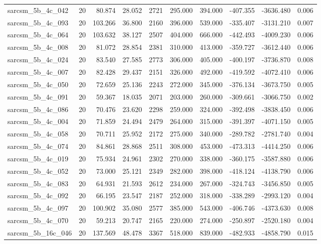 \begin{tabular}{lrrrrrrrrr}
sarcsm\_5b\_4c\_042 & 20 & 80.874 & 28.052 & 2721 & 295.000 & 394.000 & -407.355 & -3636.480 & 0.006 \\
sarcsm\_5b\_4c\_093 & 20 & 103.266 & 36.800 & 2160 & 396.000 & 539.000 & -335.407 & -3131.210 & 0.007 \\
sarcsm\_5b\_4c\_064 & 20 & 103.632 & 38.127 & 2507 & 404.000 & 666.000 & -442.493 & -4009.230 & 0.006 \\
sarcsm\_5b\_4c\_008 & 20 & 81.072 & 28.854 & 2381 & 310.000 & 413.000 & -359.727 & -3612.440 & 0.006 \\
sarcsm\_5b\_4c\_024 & 20 & 83.540 & 27.585 & 2773 & 306.000 & 405.000 & -400.197 & -3736.870 & 0.008 \\
sarcsm\_5b\_4c\_007 & 20 & 82.428 & 29.437 & 2151 & 326.000 & 492.000 & -419.592 & -4072.410 & 0.006 \\
sarcsm\_5b\_4c\_050 & 20 & 72.659 & 25.136 & 2243 & 272.000 & 345.000 & -376.134 & -3673.750 & 0.005 \\
sarcsm\_5b\_4c\_091 & 20 & 59.367 & 18.035 & 2071 & 203.000 & 260.000 & -309.661 & -3066.750 & 0.002 \\
sarcsm\_5b\_4c\_086 & 20 & 70.476 & 23.620 & 2298 & 259.000 & 324.000 & -392.498 & -3838.450 & 0.006 \\
sarcsm\_5b\_4c\_004 & 20 & 71.859 & 24.494 & 2479 & 264.000 & 315.000 & -391.397 & -4071.150 & 0.005 \\
sarcsm\_5b\_4c\_058 & 20 & 70.711 & 25.952 & 2172 & 275.000 & 340.000 & -289.782 & -2781.740 & 0.004 \\
sarcsm\_5b\_4c\_074 & 20 & 84.861 & 28.868 & 2511 & 308.000 & 453.000 & -473.313 & -4414.250 & 0.006 \\
sarcsm\_5b\_4c\_019 & 20 & 75.934 & 24.961 & 2302 & 270.000 & 338.000 & -360.175 & -3587.880 & 0.006 \\
sarcsm\_5b\_4c\_052 & 20 & 73.000 & 25.121 & 2349 & 282.000 & 398.000 & -418.124 & -4138.790 & 0.006 \\
sarcsm\_5b\_4c\_083 & 20 & 64.931 & 21.593 & 2612 & 234.000 & 267.000 & -324.743 & -3456.850 & 0.005 \\
sarcsm\_5b\_4c\_092 & 20 & 66.195 & 23.547 & 2187 & 252.000 & 318.000 & -338.289 & -2993.120 & 0.004 \\
sarcsm\_5b\_4c\_097 & 20 & 100.902 & 35.080 & 2577 & 385.000 & 543.000 & -406.746 & -4373.630 & 0.008 \\
sarcsm\_5b\_4c\_070 & 20 & 59.213 & 20.747 & 2165 & 220.000 & 274.000 & -250.897 & -2520.180 & 0.004 \\
sarcsm\_5b\_16c\_046 & 20 & 137.569 & 48.478 & 3367 & 518.000 & 839.000 & -482.933 & -4858.790 & 0.015 \\

\end{tabular}
